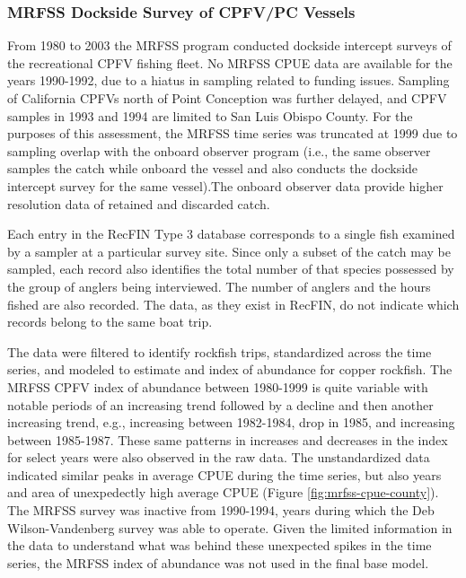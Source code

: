 \documentclass[11pt,
  english,
  letterpaper,
]{article}
\begin{document}
\hypertarget{mrfss-dockside-survey-of-cpfvpc-vessels}{%
\subsubsection{MRFSS Dockside Survey of CPFV/PC Vessels}\label{mrfss-dockside-survey-of-cpfvpc-vessels}}

From 1980 to 2003 the MRFSS program conducted dockside intercept surveys of the recreational CPFV fishing fleet. No MRFSS CPUE data are available for the years 1990-1992, due to a hiatus in sampling related to funding issues. Sampling of California CPFVs north of Point Conception was further delayed, and CPFV samples in 1993 and 1994 are limited to San Luis Obispo County. For the purposes of this assessment, the MRFSS time series was truncated at 1999 due to sampling overlap with the onboard observer program (i.e., the same observer samples the catch while onboard the vessel and also conducts the dockside intercept survey for the same vessel).The onboard observer data provide higher resolution data of retained and discarded catch.

Each entry in the RecFIN Type 3 database corresponds to a single fish examined by a sampler at a particular survey site. Since only a subset of the catch may be sampled, each record also identifies the total number of that species possessed by the group of anglers being interviewed. The number of anglers and the hours fished are also recorded. The data, as they exist in RecFIN, do not indicate which records belong to the same boat trip.

The data were filtered to identify rockfish trips, standardized across the time series, and modeled to estimate and index of abundance for copper rockfish. The MRFSS CPFV index of abundance between 1980-1999 is quite variable with notable periods of an increasing trend followed by a decline and then another increasing trend, e.g., increasing between 1982-1984, drop in 1985, and increasing between 1985-1987. These same patterns in increases and decreases in the index for select years were also observed in the raw data. The unstandardized data indicated similar peaks in average CPUE during the time series, but also years and area of unexpedectly high average CPUE (Figure \ref{fig:mrfss-cpue-county}). The MRFSS survey was inactive from 1990-1994, years during which the Deb Wilson-Vandenberg survey was able to operate. Given the limited information in the data to understand what was behind these unexpected spikes in the time series, the MRFSS index of abundance was not used in the final base model.
\end{document}
